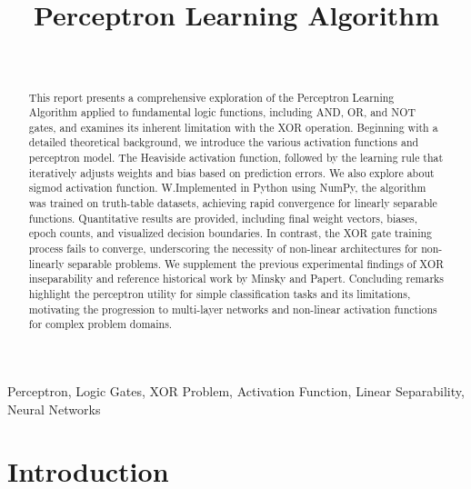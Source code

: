 \documentclass[a4paper, journal]{IEEEtran}
\begin{document}
\title{Perceptron Learning Algorithm}
\author{
 \\
}

\maketitle

\begin{abstract}
This report presents a comprehensive exploration of the Perceptron Learning Algorithm applied to fundamental logic functions, including AND, OR, and NOT gates, and examines its inherent limitation with the XOR operation. Beginning with a detailed theoretical background, we introduce the various activation functions and perceptron model. The Heaviside activation function, followed by the learning rule that iteratively adjusts weights and bias based on prediction errors. We also explore about sigmod activation function. W.Implemented in Python using NumPy, the algorithm was trained on truth-table datasets, achieving rapid convergence for linearly separable functions. Quantitative results are provided, including final weight vectors, biases, epoch counts, and visualized decision boundaries. In contrast, the XOR gate training process fails to converge, underscoring the necessity of non-linear architectures for non-linearly separable problems. We supplement the previous experimental findings of XOR inseparability and reference historical work by Minsky and Papert. Concluding remarks highlight the perceptron utility for simple classification tasks and its limitations, motivating the progression to multi-layer networks and non-linear activation functions for complex problem domains.

\end{abstract}

\begin{IEEEkeywords}
    Perceptron, Logic Gates, XOR Problem, Activation Function, Linear Separability, Neural Networks
\end{IEEEkeywords}

\section{Introduction}
\end{document}
